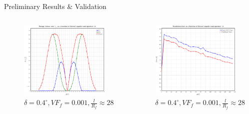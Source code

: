 \documentclass[final]{beamer}
\begin{document}
\begin{frame}
\begin{center}
\begin{minipage}{\textwidth}
\begin{alertblock}{\rule[-0.6ex]{0pt}{50pt}\centering\LARGE Preliminary Results \& Validation}
\begin{columns}
\begin{column}{0.375\textwidth}
\begin{center}
\captionsetup[subfigure]{labelformat=empty}
\begin{figure}[!h]
\centering
 \includegraphics[width=0.9\columnwidth]{2017-03-03_AbqRunSummary_Gs.pdf}
 \caption{$\delta=0.4^{\circ},VF_{f}=0.001,\frac{l}{R_{f}}\approx28$}
\end{figure}
     \end{center}
\end{column}
\begin{column}{0.375\textwidth}  %
    \begin{center}
\begin{figure}[!h]
\centering
     \includegraphics[width=0.9\columnwidth]{cpus-time.pdf}
 \caption{$\delta=0.4^{\circ},VF_{f}=0.001,\frac{l}{R_{f}}\approx28$}
\end{figure}
     \end{center}
\end{column}
\end{columns}
\end{alertblock}
\end{minipage}
\end{center}


\end{frame}
\end{document}
